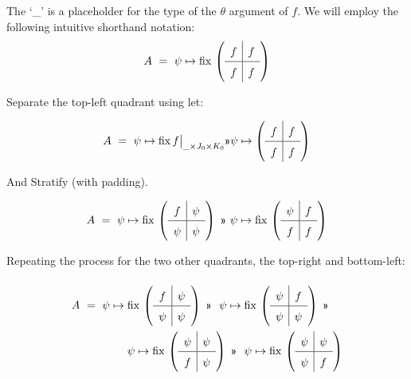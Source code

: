 \documentclass{article}
\begin{document}
The `\_' is a placeholder for the type of the $\theta$ argument of $f$.
We will employ the following intuitive shorthand notation:
\newcommand\quadrants[4]{
  \renewcommand\arraystretch{1.5}
   \begin{array}{c|c}
     #1 & #2 \\ \hline
     #3 & #4
   \end{array}}
%
\[
A ~=~ \psi\mapsto\mathrm{fix}\,\left(\quadrants{f}{f}{f}{f}\right)
 \]

Separate the top-left quadrant using let:

\[
A ~=~ \psi\mapsto\mathrm{fix}\, f\big|_{\_\times J_0\times K_0} \applt \psi\mapsto\left(\quadrants{f}{f}{f}{f}\right)
 \]

And Stratify (with padding).

\[
A ~=~  \psi\mapsto\mathrm{fix}\,\left( \quadrants{f}{\psi}{\psi}{\psi} \right)
  ~\applt~ 
  \psi\mapsto\mathrm{fix}\,\left( \quadrants{\psi}{f}{f}{f} \right)
\]

Repeating the process for the two other quadrants, the top-right and bottom-left:

\[
\renewcommand\arraystretch{3}
\begin{array}{l@{}l}
A ~=~ \psi\mapsto{} & \mathrm{fix}\,\left( \quadrants{f}{\psi}{\psi}{\psi} \right)
        ~\applt~~ 
        \psi\mapsto\mathrm{fix}\,\left( \quadrants{\psi}{f}{\psi}{\psi} \right)
        ~\applt~ \\
      & \psi\mapsto\mathrm{fix}\,\left( \quadrants{\psi}{\psi}{f}{\psi} \right)
        ~\applt~~ 
        \psi\mapsto\mathrm{fix}\,\left( \quadrants{\psi}{\psi}{\psi}{f} \right)
\end{array}
\]




\end{document}
